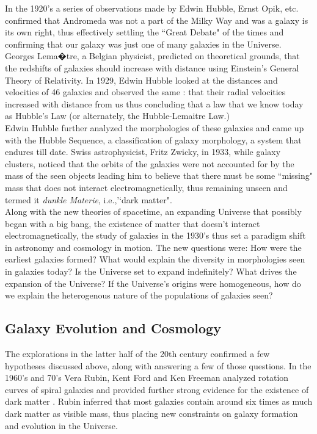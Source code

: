 In the 1920's a series of observations made by Edwin Hubble, Ernst Opik, etc. confirmed that Andromeda was not a part of the Milky Way and was a galaxy is its own right, thus effectively settling the ``Great Debate" of the times and confirming that our galaxy was just one of many galaxies in the Universe. Georges Lema�tre, a Belgian physicist, predicted on theoretical grounds, that the redshifts of galaxies should increase with distance using Einstein's General Theory of Relativity. In 1929, Edwin Hubble looked at the distances and velocities of 46 galaxies and observed the same \citep{1929PNAS...15..168H}: that their radial velocities increased with distance from us thus concluding that a law that we know today as Hubble's Law (or alternately, the Hubble-Lemaitre Law.)\\

Edwin Hubble further analyzed the morphologies of these galaxies and came up with the Hubble Sequence, a classification of galaxy morphology, a system that endures till date. Swiss astrophysicist, Fritz Zwicky, in 1933, while galaxy clusters, noticed that the orbits of the galaxies were not accounted for by the mass of the seen objects leading him to believe that there must be some ``missing" mass \citep{1937ApJ....86..217Z} that does not interact electromagnetically, thus remaining unseen and termed it \emph{dunkle Materie}, i.e.,'`dark matter".\\

 Along with the new theories of spacetime, an expanding Universe that possibly began with a big bang, the existence of matter that doesn't interact electromagnetically, the study of galaxies in the 1930's thus set a paradigm shift in astronomy and cosmology in motion. The new questions were: How were the earliest galaxies formed? What would explain the diversity in morphologies seen in galaxies today? Is the Universe set to expand indefinitely? What drives the expansion of the Universe? If the Universe's origins were homogeneous, how do we explain the heterogenous nature of the populations of galaxies seen? 

\subsection{Galaxy Evolution and Cosmology}

The explorations in the latter half of the 20th century confirmed a few hypotheses discussed above, along with answering a few of those questions. In the 1960's and 70's Vera Rubin, Kent Ford and Ken Freeman analyzed rotation curves of spiral galaxies and provided further strong evidence for the existence of dark matter \citep{freeman_disks_1970-1}. Rubin inferred that most galaxies contain around six times as much dark matter as visible mass\citep{rubin_rotational_1980}, thus placing new constraints on galaxy formation and evolution in the Universe.\\

